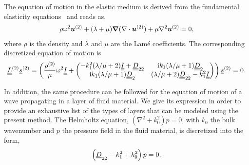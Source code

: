 The equation of motion in the elastic medium is derived from the fundamental elasticity equations~\cite{achenbach2014} and reads as, 
    \begin{equation}
        \rho \omega^2 \boldsymbol u^{(2)} + (\lambda + \mu) \boldsymbol{\nabla}(\nabla \cdot \boldsymbol u^{(2)} ) + \mu\nabla^2 \boldsymbol u^{(2)} = 0,
    \label{eq:elastodynamic}
    \end{equation}
where $\rho$ is the density and $\lambda$ and $\mu$ are the Lam\'e coefficients.
The corresponding discretized equation of motion is
        \begin{equation}
             \underline{\underline{L}}^{(2)} \underline{s}^{(2)} =\left(\frac{\rho^{(2)}}{\mu} \omega^2 \underline{\underline{I}} +
            \begin{pmatrix}
                - k_1^2(\lambda / \mu + 2) \underline{\underline{I}} + \underline{\underline{D}}_{22}& \mathrm i  k_1 (\lambda / \mu + 1) \underline{\underline{D}}_2 \\
                \mathrm i  k_1 (\lambda/ \mu + 1) \underline{\underline{D}}_2 & (\lambda / \mu + 2)\underline{\underline{D}}_{22} - k_1^2 \underline{\underline{I}}
            \end{pmatrix} \right) \underline{s}^{(2)} = 0.
            \label{eq:elastodynamic_discrete}
        \end{equation}
        
{In addition, the same procedure can be followed for the equation of motion of a wave propagating in a layer of fluid material. We give its expression in order to provide an exhaustive list of the types of layers that can be modeled using the present method. The Helmholtz equation, $(\nabla^2  + k_0^2) p = 0$, with $k_0$ the bulk wavenumber and $p$ the pressure field in the fluid material, is discretized into the form,}
{\begin{equation}
    \left( \underline{\underline{D}}_{22} - k_1^2 + k_0^2 \right) \underline{p} = 0.
\end{equation}}
    
